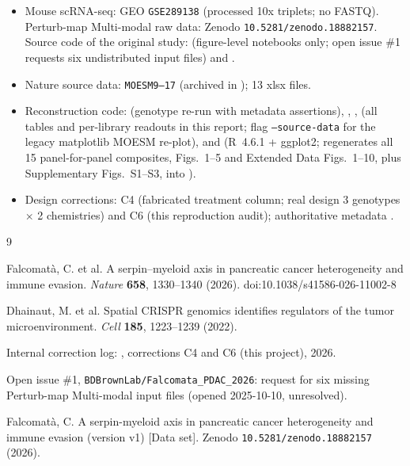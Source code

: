 \documentclass[preprint,12pt]{elsarticle}
\begin{document}
\begin{itemize}
\item Mouse scRNA-seq: GEO \texttt{GSE289138} (processed 10x
triplets; no FASTQ). Perturb-map Multi-modal raw data: Zenodo
\texttt{10.5281/zenodo.18882157}. Source code of the original
study: 
(figure-level notebooks only; open issue \#1 requests six
undistributed input files) and
.
\item Nature source data: \texttt{MOESM9--17} (archived in
); 13 xlsx files.
\item Reconstruction code: 
(genotype re-run with metadata assertions),
,
,
 (all tables and
per-library readouts in this report; flag \texttt{--source-data} for
the legacy matplotlib MOESM re-plot), and
 (R~4.6.1 + ggplot2; regenerates
all 15 panel-for-panel composites, Figs.~1--5 and Extended Data
Figs.~1--10, plus Supplementary Figs.~S1--S3, into
).
\item Design corrections:  C4 (fabricated
treatment column; real design 3 genotypes $\times$ 2 chemistries)
and C6 (this reproduction audit); authoritative metadata
.
\end{itemize}

\begin{thebibliography}{9}

Falcomat\`a, C. et al. A serpin--myeloid axis in pancreatic cancer
heterogeneity and immune evasion. \emph{Nature} \textbf{658},
1330--1340 (2026). doi:10.1038/s41586-026-11002-8

Dhainaut, M. et al. Spatial CRISPR genomics identifies regulators of
the tumor microenvironment. \emph{Cell} \textbf{185}, 1223--1239
(2022).

Internal correction log: , corrections C4
and C6 (this project), 2026.

Open issue \#1, \texttt{BDBrownLab/Falcomata\_PDAC\_2026}: request
for six missing Perturb-map Multi-modal input files (opened
2025-10-10, unresolved).

Falcomat\`a, C. A serpin-myeloid axis in pancreatic cancer
heterogeneity and immune evasion (version v1) [Data set]. Zenodo
\texttt{10.5281/zenodo.18882157} (2026).

\end{thebibliography}
\end{document}

